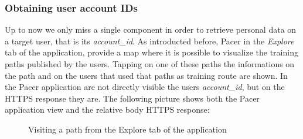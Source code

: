 			\subsubsection{Obtaining user account IDs}
				\par Up to now we only miss a single component in order to retrieve personal data on a target user, that is its \textit{account\_id}. As introducted before, Pacer in the \textit{Explore} tab of the application, provide a map where it is possible to visualize the training paths published by the users. Tapping on one of these paths the informations on the path and on the users that used that paths as training route are shown. In the Pacer application are not directly visible the users \textit{account\_id}, but on the HTTPS response they are. The following picture shows both the Pacer application view and the relative body HTTPS response:\newpage
			\begin{figure}[ht]
				\centering
				\caption{Visiting a path from the Explore tab of the application}
			\end{figure}
			
